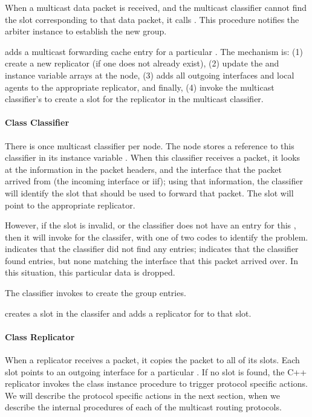 When a multicast data packet is received, and the multicast
classifier cannot find the slot corresponding to that data packet,
it calls .
This procedure notifies the arbiter instance to establish the new group.

 adds a multicast forwarding cache entry for
a particular .
The mechanism is:
(1) create a new replicator (if one does not already exist),
(2) update the  and 
 instance variable arrays at the node,
(3) adds all outgoing interfaces and local agents
to the appropriate replicator,
and finally,
(4) invoke the multicast classifier's 
 to create a slot for the replicator in the multicast classifier.

\paragraph{Class Classifier}
There is once multicast classifier per node.
The node stores a reference to this classifier in its instance variable
.
When this classifier receives a packet,
it looks at the  information in the packet headers,
and the interface that the packet arrived from (the incoming interface or iif);
using that information, the classifier will identify the slot
that should be used to forward that packet.  The slot will point
to the appropriate replicator.

However, if the slot is invalid, or the classifier does not have an
entry for this ,
then it will invoke  for the classifer,
with one of two codes to identify the problem.
 indicates that the classifier did not find any
 entries;
 indicates that the classifier found 
entries, but none matching the interface that this packet arrived over.
In this situation, this particular data is dropped.

The classifier  invokes 
to create the group entries.

 creates a slot in the classifer
and adds a replicator for  to that slot.

\paragraph{Class Replicator}
When a replicator receives a packet,
it copies the packet to all of its slots.
Each slot points to an outgoing interface for a particular 
.
If no slot is found, the C++ replicator invokes the class 
instance procedure  to
trigger protocol specific actions.
We will describe the protocol specific actions in the next section,
when we describe the internal procedures of each of the 
multicast routing protocols.

